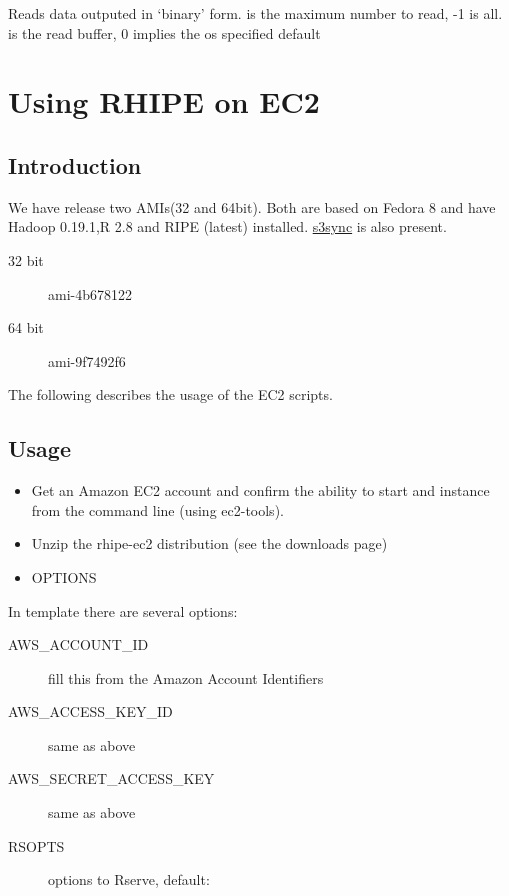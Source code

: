 \documentclass[letterpaper,10pt,english]{manual}
\begin{document}
Reads data outputed in `binary' form.  is the maximum number to read, -1
is all.  is the read buffer, 0 implies the os specified default 

\resetcurrentobjects
\hypertarget{--doc-ec2}{}

\chapter{Using RHIPE on EC2}


\section{Introduction}

We have release two AMIs(32 and 64bit). Both are based on Fedora 8 and have
Hadoop 0.19.1,R 2.8 and RIPE (latest) installed. \href{http://s3sync.net/wiki}{s3sync} is also present.
\begin{description}
\item[32 bit]
ami-4b678122

\item[64 bit]
ami-9f7492f6

\end{description}

The following describes the usage of the EC2 scripts.


\section{Usage}
\begin{itemize}
\item {} 
Get an Amazon EC2 account and confirm the ability to start and instance from the command line (using ec2-tools).

\item {} 
Unzip the rhipe-ec2 distribution (see the downloads page)

\item {} 
OPTIONS

\end{itemize}

In  template there are several options:
\begin{description}
\item[AWS\_ACCOUNT\_ID]
fill this from the Amazon Account Identifiers

\item[AWS\_ACCESS\_KEY\_ID]
same as above

\item[AWS\_SECRET\_ACCESS\_KEY]
same as above

\item[RSOPTS]
options to Rserve, default:

\end{description}
\end{document}
